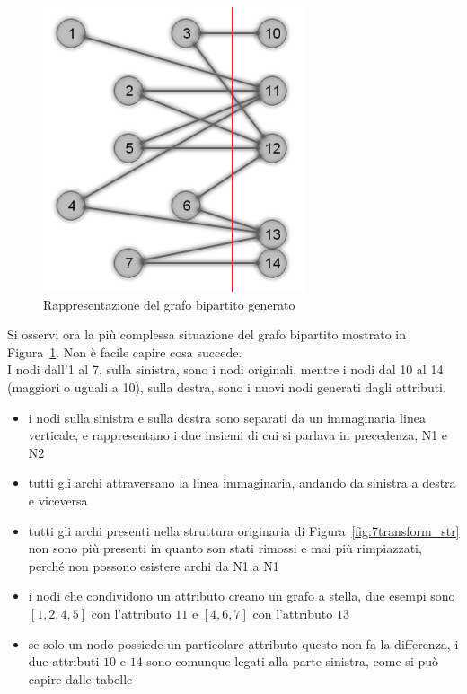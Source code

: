 %
\begin{figure}[htp]
	\centering
	\includegraphics{immagini/7transform_bipartite}
	\caption{Rappresentazione del grafo bipartito generato}
	\label{fig:7transform_bipartite}
\end{figure}
%
Si osservi ora la più complessa situazione del grafo bipartito mostrato in Figura~\ref{fig:7transform_bipartite}. Non è facile capire cosa succede.\\
I nodi dall'1 al 7, sulla sinistra, sono i nodi originali, mentre i nodi dal 10 al 14 (maggiori o uguali a 10), sulla destra, sono i nuovi nodi generati dagli attributi.
\begin{itemize}
	\item i nodi sulla sinistra e sulla destra sono separati da un immaginaria linea verticale, e rappresentano i due insiemi di cui si parlava in precedenza, N1 e N2
	\item tutti gli archi attraversano la linea immaginaria, andando da sinistra a destra e viceversa
	\item tutti gli archi presenti nella struttura originaria di Figura~\ref{fig:7transform_str} non sono più presenti in quanto son stati rimossi e mai più rimpiazzati, perché non possono esistere archi da N1 a N1
	\item i nodi che condividono un attributo creano un grafo a stella, due esempi sono $[1,2,4,5]$ con l'attributo $11$ e $[4,6,7]$ con l'attributo $13$
	\item se solo un nodo possiede un particolare attributo questo non fa la differenza, i due attributi $10$ e $14$ sono comunque legati alla parte sinistra, come si può capire dalle tabelle
\end{itemize}
%



